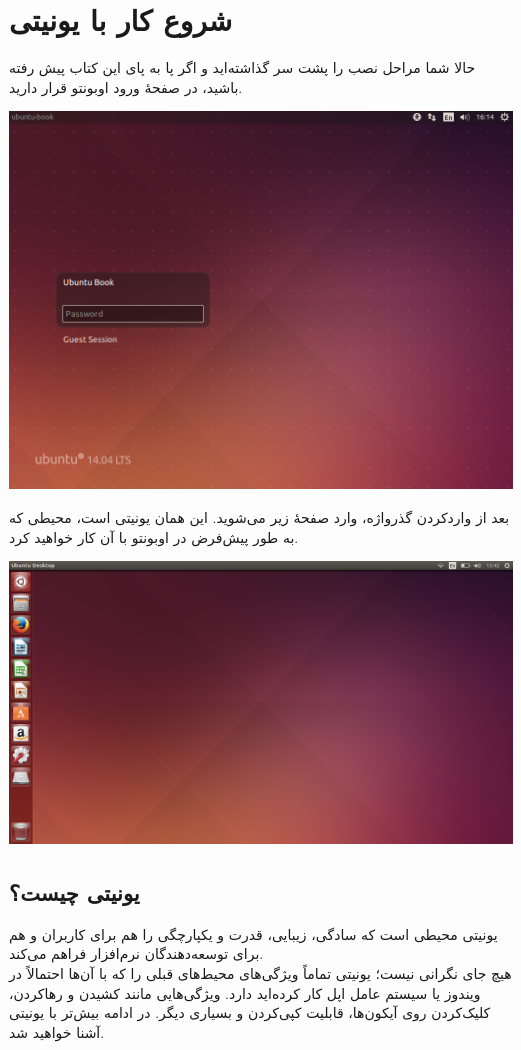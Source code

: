 \chapter{شروع کار با یونیتی}
حالا شما مراحل نصب را پشت سر گذاشته‌اید و اگر پا به پای این کتاب پیش رفته باشید، در صفحهٔ ورود اوبونتو قرار دارید.\\
\begin{center}
\includegraphics[scale=0.65]{pics/13.png}
\end{center}

بعد از واردکردن گذرواژه، وارد صفحهٔ زیر می‌شوید. این همان یونیتی است، محیطی که به طور پیش‌فرض در اوبونتو با آن کار خواهید کرد.
\begin{flushleft}
\includegraphics[scale=0.38]{pics/14.png}
\end{flushleft}

\section{یونیتی چیست؟}
یونیتی محیطی است که سادگی، زیبایی، قدرت و یکپارچگی را هم برای کاربران و هم برای توسعه‌دهندگان نرم‌افزار فراهم می‌کند.\\
هیچ جای نگرانی نیست؛ یونیتی تماماً ویژگی‌های محیط‌های قبلی را که با آن‌ها احتمالاً در ویندوز یا سیستم عامل اپل کار کرده‌اید دارد. ویژگی‌هایی مانند کشیدن و رهاکردن، کلیک‌کردن روی آیکون‌ها، قابلیت کپی‌کردن و بسیاری دیگر.
در ادامه بیش‌تر با یونیتی آشنا خواهید شد.
